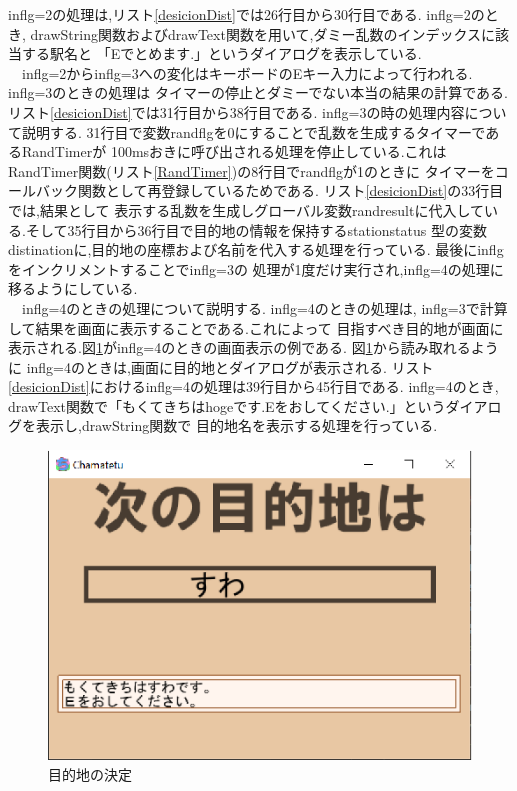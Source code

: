 \documentclass[a4j]{jarticle}
\begin{document}
            inflg=2の処理は,リスト\ref{desicionDist}では26行目から30行目である. inflg=2のとき,
            drawString関数およびdrawText関数を用いて,ダミー乱数のインデックスに該当する駅名と
            「Eでとめます.」というダイアログを表示している.\\
            　inflg=2からinflg=3への変化はキーボードのEキー入力によって行われる. inflg=3のときの処理は
            タイマーの停止とダミーでない本当の結果の計算である. リスト\ref{desicionDist}では31行目から38行目である.
            inflg=3の時の処理内容について説明する. 31行目で変数randflgを0にすることで乱数を生成するタイマーであるRandTimerが
            100msおきに呼び出される処理を停止している.これはRandTimer関数(リスト\ref{RandTimer})の8行目でrandflgが1のときに
            タイマーをコールバック関数として再登録しているためである. リスト\ref{desicionDist}の33行目では,結果として
            表示する乱数を生成しグローバル変数randresultに代入している.そして35行目から36行目で目的地の情報を保持するstationstatus
            型の変数distinationに,目的地の座標および名前を代入する処理を行っている. 最後にinflgをインクリメントすることでinflg=3の
            処理が1度だけ実行され,inflg=4の処理に移るようにしている.\\
            　inflg=4のときの処理について説明する. inflg=4のときの処理は, inflg=3で計算して結果を画面に表示することである.これによって
            目指すべき目的地が画面に表示される.図\ref{distflg4}がinflg=4のときの画面表示の例である. 図\ref{distflg4}から読み取れるように
            inflg=4のときは,画面に目的地とダイアログが表示される. リスト\ref{desicionDist}におけるinflg=4の処理は39行目から45行目である.
            inflg=4のとき, drawText関数で「もくてきちはhogeです.Eをおしてください.」というダイアログを表示し,drawString関数で
            目的地名を表示する処理を行っている.

            \begin{figure}[H]
                \centering
                \includegraphics[scale=1.3]{distflg4.eps}
                \caption{目的地の決定}
                 \label{distflg4}
                \end{figure} 
\end{document}
